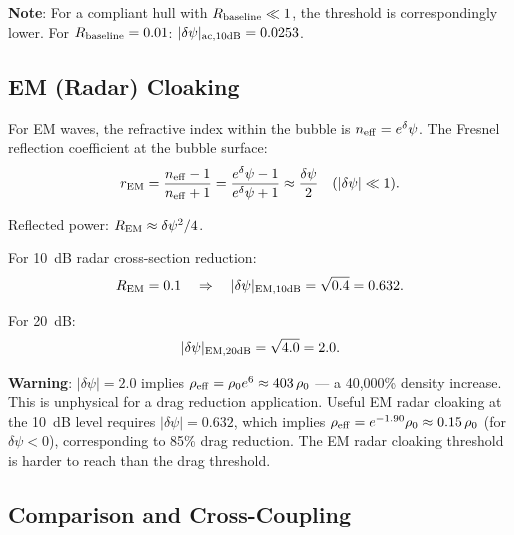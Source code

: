 \documentclass[11pt,twocolumn]{article}
\newcommand{\dpsi}{\delta\psi}
\begin{document}
\textbf{Note}: For a compliant hull with $R_{\rm baseline} \ll 1$, the
threshold is correspondingly lower. For $R_{\rm baseline} = 0.01$:
$|\dpsi|_{\rm ac,10dB} = 0.0253$.

\subsection{EM (Radar) Cloaking}

For EM waves, the refractive index within the bubble is $n_{\rm eff} = e^\dpsi$.
The Fresnel reflection coefficient at the bubble surface:
\begin{equation}
r_{\rm EM} = \frac{n_{\rm eff} - 1}{n_{\rm eff} + 1}
= \frac{e^\dpsi - 1}{e^\dpsi + 1} \approx \frac{\dpsi}{2}
\quad (|\dpsi| \ll 1).
\label{eq:r_em}
\end{equation}

Reflected power: $R_{\rm EM} \approx \dpsi^2/4$.

For 10~dB radar cross-section reduction:
\begin{equation}
R_{\rm EM} = 0.1 \quad\Rightarrow\quad
|\dpsi|_{\rm EM,10dB} = \sqrt{0.4} = 0.632.
\label{eq:dpsi_em}
\end{equation}

For 20~dB:
\begin{equation}
|\dpsi|_{\rm EM,20dB} = \sqrt{4.0} = 2.0.
\end{equation}

\textbf{Warning}: $|\dpsi| = 2.0$ implies $\rho_{\rm eff} =
\rho_0 e^{6} \approx 403\,\rho_0$ --- a 40,000\% density increase. This
is unphysical for a drag reduction application. Useful EM radar cloaking
at the 10~dB level requires $|\dpsi| = 0.632$, which implies
$\rho_{\rm eff} = e^{-1.90}\rho_0 \approx 0.15\,\rho_0$ (for $\dpsi < 0$),
corresponding to 85\% drag reduction. The EM radar cloaking threshold is
harder to reach than the drag threshold.

\subsection{Comparison and Cross-Coupling}
\end{document}
